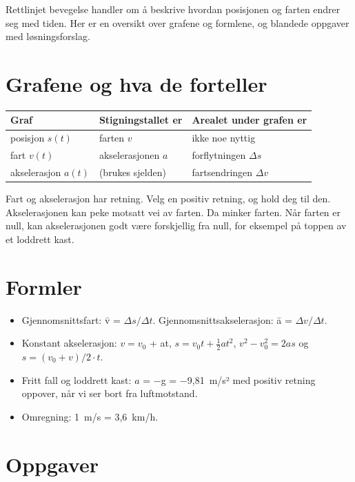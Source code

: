 \documentclass[11pt]{article}
\begin{document}

Rettlinjet bevegelse handler om å beskrive hvordan posisjonen og farten endrer seg med tiden. Her er en oversikt over grafene og formlene, og blandede oppgaver med løsningsforslag.

\section*{Grafene og hva de forteller}

\begin{center}\small
\begin{tabularx}{\linewidth}{YYY}
\toprule
\textbf{Graf} & \textbf{Stigningstallet er} & \textbf{Arealet under grafen er} \\
\midrule
posisjon $s(t)$ & farten $v$ & ikke noe nyttig \\
fart $v(t)$ & akselerasjonen $a$ & forflytningen $Δs$ \\
akselerasjon $a(t)$ & (brukes sjelden) & fartsendringen $Δv$ \\
\bottomrule
\end{tabularx}
\end{center}

Fart og akselerasjon har retning. Velg en positiv retning, og hold deg til den. Akselerasjonen kan peke motsatt vei av farten. Da minker farten. Når farten er null, kan akselerasjonen godt være forskjellig fra null, for eksempel på toppen av et loddrett kast.

\section*{Formler}

\begin{itemize}
\item Gjennomsnittsfart: v̄ = $Δs/Δt$. Gjennomsnittsakselerasjon: ā = $Δv/Δt$.
\item Konstant akselerasjon: $v = v_{0}$ + at, $s = v_{0}t + \tfrac{1}{2}at^{2}$, $v^{2} - v_{0}^{2} = 2as$ og $s = (v_{0} + v)/2 \cdot t$.
\item Fritt fall og loddrett kast: $a$ = −g = −9,81~m/s² med positiv retning oppover, når vi ser bort fra luftmotstand.
\item Omregning: 1~m/s = 3,6~km/h.
\end{itemize}

\section*{Oppgaver}
\end{document}
